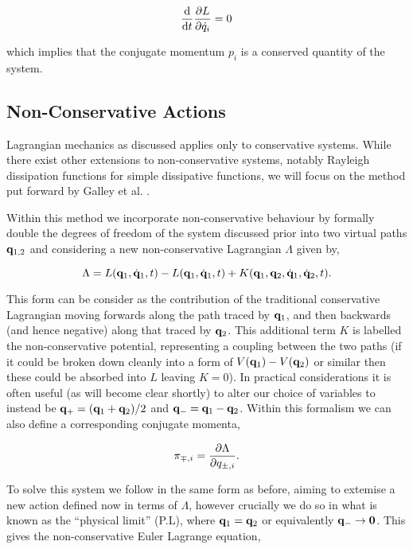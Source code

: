 \begin{equation}
  \frac{\dd}{\dd t}\frac{\partial L}{\partial \dot q_i} = 0
\end{equation}

which implies that the conjugate momentum $p_i$ is a conserved quantity of the system.

\subsection{Non-Conservative Actions}
\label{sec:intro-nc-actions}

Lagrangian mechanics as discussed applies only to conservative systems. While there exist other extensions to non-conservative systems, notably Rayleigh dissipation functions \cite{struttGeneralTheoremsRelating1871} for simple dissipative functions, we will focus on the method put forward by Galley et al. \cite{galleyClassicalMechanicsNonconservative2013}.

Within this method we incorporate non-conservative behaviour by formally double the degrees of freedom of the system discussed prior into two virtual paths $\vb q_{1,2}$ and considering a new non-conservative Lagrangian $\Lambda$ given by,

\begin{equation}
  \Lambda = L(\vb{q}_1, \dot{\vb{q}}_1, t) - L(\vb{q}_1, \dot{\vb{q}}_1, t) + K(\vb{q}_1, \vb{q}_2, \dot{\vb{q}}_1, \dot{\vb{q}}_2, t).
\end{equation}

This form can be consider as the contribution of the traditional conservative Lagrangian moving forwards along the path traced by $\vb{q}_1$, and then backwards (and hence negative) along that traced by $\vb{q}_2$. This additional term $K$ is labelled the non-conservative potential, representing a coupling between the two paths (if it could be broken down cleanly into a form of $V(\vb{q}_1) - V(\vb{q}_2)$ or similar then these could be absorbed into $L$ leaving $K = 0$). In practical considerations it is often useful (as will become clear shortly) to alter our choice of variables to instead be $\vb{q}_+ = {(\vb{q}_1 + \vb{q}_2)}/{2}$ and $\vb{q}_- = \vb{q}_1 - \vb{q}_2$. Within this formalism we can also define a corresponding conjugate momenta,

\begin{equation}
  \pi_{\mp, i} = \frac{\partial \Lambda}{\partial q_{\pm,i}}.
\end{equation}

To solve this system we follow in the same form as before, aiming to extemise a new action defined now in terms of $\Lambda$, however crucially we do so in what is known as the \enquote{physical limit} (P.L), where $\vb{q}_1 = \vb{q}_2$ or equivalently $\vb{q}_- \to \vb 0$. This gives the non-conservative Euler Lagrange equation,


